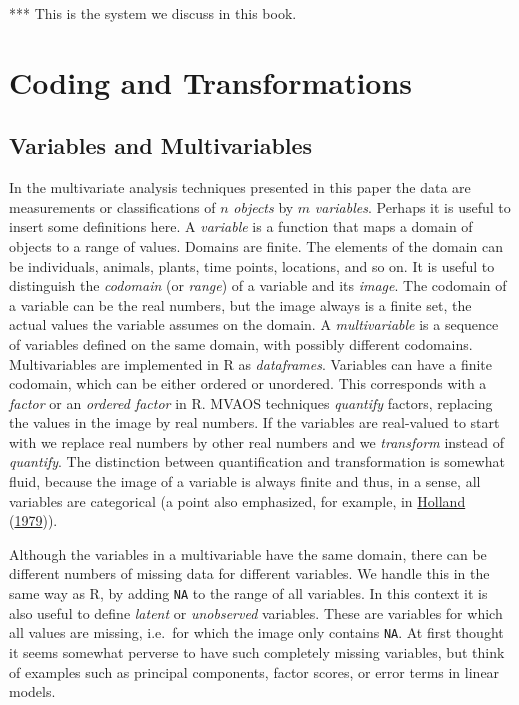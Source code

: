 \documentclass[
  12pt,
]{book}
\begin{document}
*** This is the system we discuss in this book.

\hypertarget{coding-and-transformations}{%
\chapter{Coding and Transformations}\label{coding-and-transformations}}

\hypertarget{variables-and-multivariables}{%
\section{Variables and Multivariables}\label{variables-and-multivariables}}

In the multivariate analysis techniques presented in this paper the data are measurements or classifications of \(n\) \emph{objects} by \(m\) \emph{variables}.
Perhaps it is useful to insert some definitions here. A \emph{variable} is a function that maps a domain of objects to a range of values. Domains are finite. The elements of the domain can be individuals, animals, plants, time points, locations, and so on. It is useful to distinguish the \emph{codomain} (or \emph{range}) of a variable and its \emph{image}. The codomain of a variable can be the real numbers, but the image always is a finite set, the actual values the variable assumes on the domain. A \emph{multivariable} is a sequence of variables defined on the same domain, with possibly different codomains. Multivariables are implemented in R as \emph{dataframes}. Variables can have a finite codomain, which can be either ordered or unordered. This corresponds with a \emph{factor} or an \emph{ordered factor} in R. MVAOS techniques \emph{quantify} factors, replacing the values in the image by real numbers. If the variables are real-valued to start with we replace real numbers by other real numbers and we \emph{transform} instead of \emph{quantify}. The distinction between quantification and transformation is somewhat fluid, because the image of a variable is always finite and thus, in a sense, all variables are categorical (a point also emphasized, for example, in \protect\hyperlink{ref-holland_79}{Holland} (\protect\hyperlink{ref-holland_79}{1979})).

Although the variables in a multivariable have the same domain, there can be different numbers of missing data for different variables. We handle this in the same way as R, by adding \texttt{NA} to the range of all variables. In this context it is also useful to define \emph{latent} or \emph{unobserved} variables. These are variables for which all values are missing, i.e.~for which the image only contains \texttt{NA}. At first thought it seems somewhat perverse to have such completely missing variables, but think of examples such as principal components, factor scores, or error terms in linear models.
\end{document}
